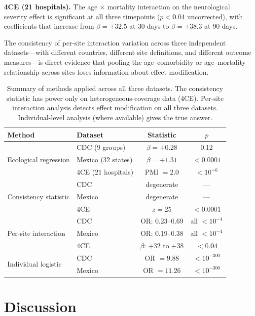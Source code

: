 \documentclass{article}
\begin{document}
\textbf{4CE (21 hospitals).}  The age $\times$ mortality interaction on the
neurological severity effect is significant at all three timepoints
($p < 0.04$ uncorrected), with coefficients that increase from
$\beta = +32.5$ at 30 days to $\beta = +38.3$ at 90 days.

The consistency of per-site interaction variation across three independent
datasets---with different countries, different site definitions, and
different outcome measures---is direct evidence that pooling the
age--comorbidity or age--mortality relationship across sites loses
information about effect modification.

\begin{table}[t]
\centering
\caption{Summary of methods applied across all three datasets.  The
consistency statistic has power only on heterogeneous-coverage data (4CE).
Per-site interaction analysis detects effect modification on all three
datasets.  Individual-level analysis (where available) gives the true
answer.}
\label{tab:comparison}
\begin{tabular}{llcc}
\toprule
Method & Dataset & Statistic & $p$ \\
\midrule
\multirow{3}{*}{Ecological regression}
  & CDC (9 groups) & $\beta = +0.28$ & 0.12 \\
  & Mexico (32 states) & $\beta = +1.31$ & $< 0.0001$ \\
  & 4CE (21 hospitals) & PMI $= 2.0$ & $< 10^{-6}$ \\
\midrule
\multirow{3}{*}{Consistency statistic}
  & CDC & degenerate & --- \\
  & Mexico & degenerate & --- \\
  & 4CE & $z = 25$ & $< 0.0001$ \\
\midrule
\multirow{3}{*}{Per-site interaction}
  & CDC & OR: 0.23--0.69 & all $< 10^{-4}$ \\
  & Mexico & OR: 0.19--0.38 & all $< 10^{-4}$ \\
  & 4CE & $\beta$: $+32$ to $+38$ & $< 0.04$ \\
\midrule
\multirow{2}{*}{Individual logistic}
  & CDC & OR $= 9.88$ & $< 10^{-300}$ \\
  & Mexico & OR $= 11.26$ & $< 10^{-300}$ \\
\bottomrule
\end{tabular}
\end{table}


\section{Discussion}
\end{document}
